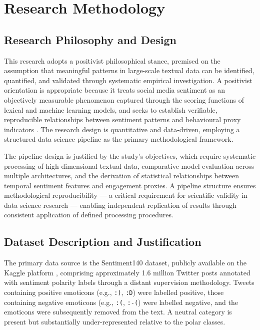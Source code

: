 \chapter{Research Methodology}
\label{ch:method}

\section{Research Philosophy and Design}

This research adopts a positivist philosophical stance, premised on the assumption that meaningful patterns in large-scale textual data can be identified, quantified, and validated through systematic empirical investigation. A positivist orientation is appropriate because it treats social media sentiment as an objectively measurable phenomenon captured through the scoring functions of lexical and machine learning models, and seeks to establish verifiable, reproducible relationships between sentiment patterns and behavioural proxy indicators \citep{saunders2019research}. The research design is quantitative and data-driven, employing a structured data science pipeline as the primary methodological framework.

The pipeline design is justified by the study's objectives, which require systematic processing of high-dimensional textual data, comparative model evaluation across multiple architectures, and the derivation of statistical relationships between temporal sentiment features and engagement proxies. A pipeline structure ensures methodological reproducibility --- a critical requirement for scientific validity in data science research \citep{wilson2017good} --- enabling independent replication of results through consistent application of defined processing procedures.

\section{Dataset Description and Justification}

The primary data source is the Sentiment140 dataset, publicly available on the Kaggle platform \citep{go2009twitter}, comprising approximately 1.6 million Twitter posts annotated with sentiment polarity labels through a distant supervision methodology. Tweets containing positive emoticons (e.g., \texttt{:)}, \texttt{:D}) were labelled positive, those containing negative emoticons (e.g., \texttt{:(}, \texttt{:-(}) were labelled negative, and the emoticons were subsequently removed from the text. A neutral category is present but substantially under-represented relative to the polar classes.

